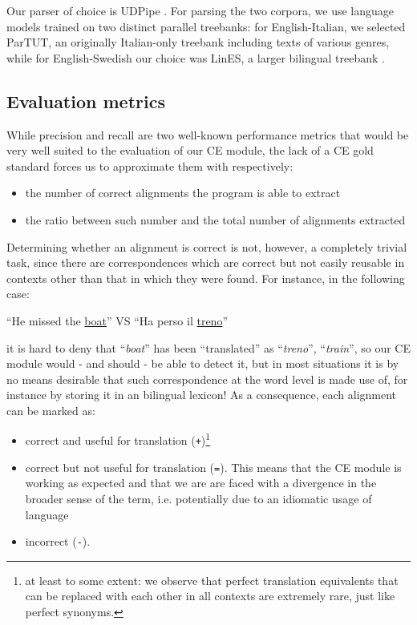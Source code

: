 Our parser of choice is UDPipe \cite{udpipe1}. For parsing the two corpora, we use language models trained on two distinct parallel treebanks: for English-Italian, we selected ParTUT, an originally Italian-only treebank including texts of various genres, while for English-Swedish our choice was LinES, a larger bilingual treebank \cite{uddocs}.

\subsection{Evaluation metrics} \label{metrics}
While precision and recall are two well-known performance metrics that would be very well suited to the evaluation of our CE module, the lack of a CE gold standard forces us to approximate them with respectively: \smallskip

\begin{itemize}
 \item the number of correct alignments the program is able to extract
 \item the ratio between such number and the total number of alignments extracted
\end{itemize} \smallskip

Determining whether an alignment is correct is not, however, a completely trivial task, since there are correspondences which are correct but not easily reusable in contexts other than that in which they were found. For instance, in the following case: \smallskip

\begin{example} \label{extrain}
 ``He missed the \underline{boat}'' VS ``Ha perso il \underline{treno}''
\end{example} \smallskip

it is hard to deny that ``\textit{boat}'' has been ``translated'' as ``\textit{treno}'', ``\textit{train}'', so our CE module would - and should - be able to detect it, but in most situations it is by no means desirable that such correspondence at the word level is made use of, for instance by storing it in an bilingual lexicon!
As a consequence, each alignment can be marked as:
\begin{itemize}
 \item correct and useful for translation (\texttt{+})\footnote{at least to some extent: we observe that perfect translation equivalents that can be replaced with each other in all contexts are extremely rare, just like perfect synonyms.}
 \item correct but not useful for translation (\texttt{=}). This means that the CE module is working as expected and that we are are faced with a divergence in the broader sense of the term, i.e. potentially due to an idiomatic usage of language
 \item incorrect (\texttt{-}).
\end{itemize} \smallskip
 
